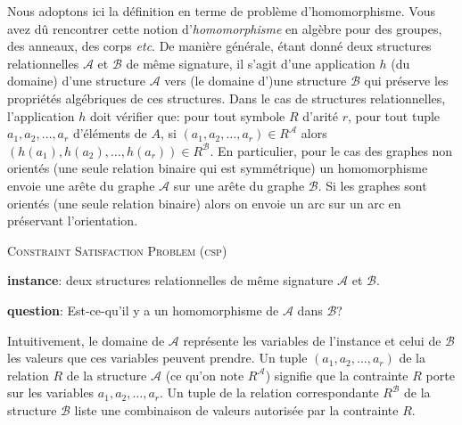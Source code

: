 \documentclass[a4paper,12pt]{article}
\theoremstyle{definition}
\theoremstyle{remark}
\begin{document}
Nous adoptons ici la définition en terme de problème d'homomorphisme.
Vous avez dû rencontrer cette notion d'\emph{homomorphisme} en algèbre
pour des groupes, des anneaux, des corps \textsl{etc}. De manière
générale, étant donné deux structures relationnelles $\mathcal{A}$ et
$\mathcal{B}$ de même signature\footnotemark{}, il s'agit d'une application $h$ (du
domaine) d'une structure $\mathcal{A}$ vers (le domaine d')une
structure $\mathcal{B}$ qui préserve les propriétés algébriques de ces
structures. 
Dans le cas de structures relationnelles, l'application
$h$ doit vérifier que: pour tout symbole $R$ d'arité $r$, pour tout tuple $a_1,a_2,\ldots,a_r$ d'éléments de $A$,
si $(a_1,a_2,\ldots,a_r)\in R^\mathcal{A}$ alors $(h(a_1),h(a_2),\ldots,h(a_r))\in R^\mathcal{B}$. 
%
En particulier, pour le cas des graphes non orientés (une seule relation
binaire qui est symmétrique) un homomorphisme envoie une arête du
graphe $\mathcal{A}$ sur une arête du graphe $\mathcal{B}$. Si les
graphes sont orientés (une seule relation binaire) alors on envoie un
arc sur un arc en préservant l'orientation.
\begin{framed}\textsc{Constraint Satisfaction Problem (csp)} 
  \begin{compactitem}
  \item \textbf{instance}: deux structures relationnelles de même signature $\mathcal{A}$ et $\mathcal{B}$.
  \item \textbf{question}: Est-ce-qu'il y a un homomorphisme de $\mathcal{A}$ dans $\mathcal{B}$?
  \end{compactitem}
\end{framed}
Intuitivement, le domaine de $\mathcal{A}$ représente les variables de l'instance et celui de $\mathcal{B}$ les valeurs que ces variables peuvent prendre.
Un tuple $(a_1,a_2,\ldots,a_r)$ de la relation $R$ de la structure $\mathcal{A}$ (ce qu'on note $R^\mathcal{A}$) signifie que la contrainte $R$ porte sur les variables $a_1,a_2,\ldots,a_r$. Un tuple de la relation correspondante $R^\mathcal{B}$ de la structure $\mathcal{B}$ liste une combinaison de valeurs autorisée par la contrainte $R$.
\end{document}
